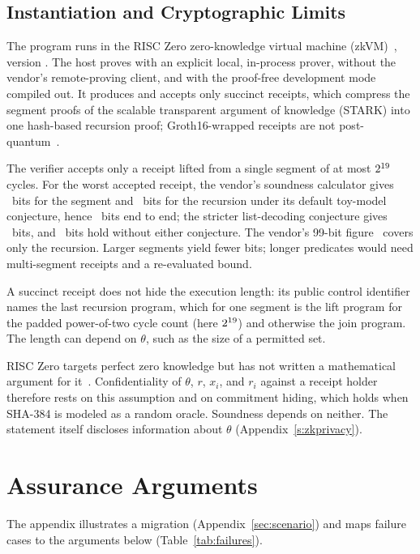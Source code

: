 \documentclass[journal]{IEEEtran}
\begin{document}
\subsection{Instantiation and Cryptographic Limits}
\label{sec:zklimits}
The program runs in the RISC Zero zero-knowledge virtual machine (zkVM)~\cite{risc0}, version \ZkVersion. The host proves with an explicit local, in-process prover, without the vendor's remote-proving client, and with the proof-free development mode compiled out. It produces and accepts only succinct receipts, which compress the segment proofs of the scalable transparent argument of knowledge (STARK) into one hash-based recursion proof; Groth16-wrapped receipts are not post-quantum~\cite{risc0sec}.

The verifier accepts only a receipt lifted from a single segment of at most $2^{19}$ cycles. For the worst accepted receipt, the vendor's soundness calculator gives \ZkSegBits~bits for the segment and \ZkRecBits~bits for the recursion under its default toy-model conjecture, hence \ZkEndBits~bits end to end; the stricter list-decoding conjecture gives \ZkStrictBits~bits, and \ZkProvenBits~bits hold without either conjecture. The vendor's 99-bit figure~\cite{risc0sec} covers only the recursion. Larger segments yield fewer bits; longer predicates would need multi-segment receipts and a re-evaluated bound.

A succinct receipt does not hide the execution length: its public control identifier names the last recursion program, which for one segment is the lift program for the padded power-of-two cycle count (here $2^{19}$) and otherwise the join program. The length can depend on $\theta$, such as the size of a permitted set.

RISC Zero targets perfect zero knowledge but has not written a mathematical argument for it~\cite{risc0sec}. Confidentiality of $\theta$, $r$, $x_i$, and $r_i$ against a receipt holder therefore rests on this assumption and on commitment hiding, which holds when SHA-384 is modeled as a random oracle. Soundness depends on neither. The statement itself discloses information about $\theta$ (Appendix~\ref{s:zkprivacy}).

\section{Assurance Arguments}
\label{sec:assurance}
The appendix illustrates a migration (Appendix~\ref{sec:scenario}) and maps failure cases to the arguments below (Table~\ref{tab:failures}).
\end{document}
